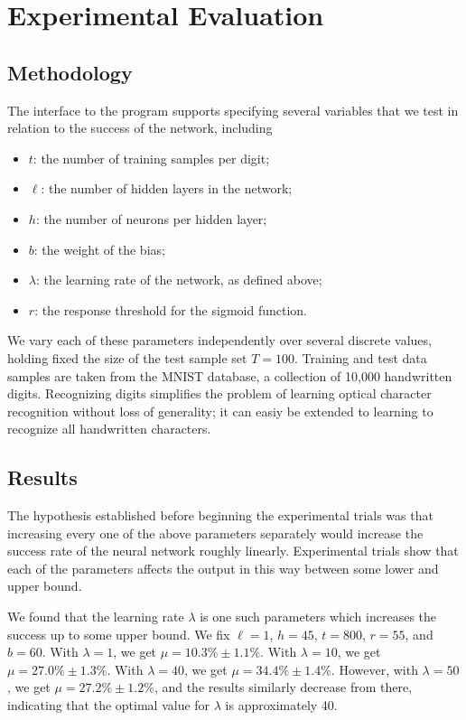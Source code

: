 \documentclass[11pt]{article}
\begin{document}
\section{Experimental Evaluation}

\subsection{Methodology}

The interface to the program supports specifying several variables that we test in relation to the success of the network, including

\begin{itemize}
\item $t$: the number of training samples per digit;
\item $\ell$: the number of hidden layers in the network;
\item $h$: the number of neurons per hidden layer;
\item $b$: the weight of the bias;
\item $\lambda$: the learning rate of the network, as defined above;
\item $r$: the response threshold for the sigmoid function.
\end{itemize}
We vary each of these parameters independently over several discrete values, holding fixed the size of the test sample set $T=100$. Training and test data samples are taken from the MNIST database, a collection of 10,000 handwritten digits. Recognizing digits simplifies the problem of learning optical character recognition without loss of generality; it can easiy be extended to learning to recognize all handwritten characters.

\subsection{Results}

The hypothesis established before beginning the experimental trials was that increasing every one of the above parameters separately would increase the success rate of the neural network roughly linearly. Experimental trials show that each of the parameters affects the output in this way between some lower and upper bound.

We found that the learning rate $\lambda$ is one such parameters which increases the success up to some upper bound. We fix $\ell=1$, $h=45$, $t=800$, $r=55$, and $b=60$. With $\lambda=1$, we get $\mu=10.3\% \pm 1.1\%$. With $\lambda=10$, we get $\mu=27.0\% \pm 1.3\%$. With $\lambda=40$, we get $\mu=34.4\% \pm 1.4\%$. However, with $\lambda=50$, we get $\mu=27.2\% \pm 1.2\%$, and the results similarly decrease from there, indicating that the optimal value for $\lambda$ is approximately 40.
\end{document}
